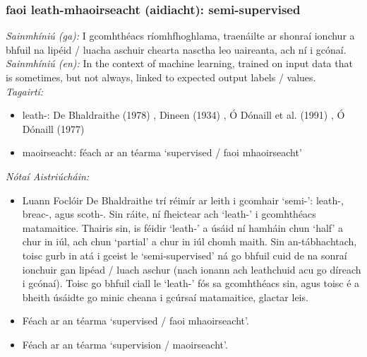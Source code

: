 \documentclass{article}
\begin{document}
\subsubsection*{faoi leath-mhaoirseacht (aidiacht): semi-supervised}
 \noindent \textit{Sainmhíniú (ga):} I gcomhthéacs ríomhfhoghlama, traenáilte ar shonraí ionchur a bhfuil na lipéid / luacha aschuir chearta nasctha leo uaireanta, ach ní i gcónaí.
\\
 \noindent \textit{Sainmhíniú (en):} In the context of machine learning, trained on input data that is sometimes, but not always, linked to expected output labels / values.
\\
 \noindent \textit{Tagairtí:}
\begin{itemize}
	\item leath-: De Bhaldraithe (1978) \cite{de-bhaldraithe}, Dineen (1934) \cite{dineen}, Ó Dónaill et al. (1991) \cite{focloir-beag}, Ó Dónaill (1977) \cite{odonaill}
	\item maoirseacht: féach ar an téarma `supervised / faoi mhaoirseacht'
\end{itemize}

 \noindent \textit{Nótaí Aistriúcháin:}
\begin{itemize}
	\item Luann Foclóir De Bhaldraithe trí réimír ar leith i gcomhair `semi-': leath-, breac-, agus scoth-. Sin ráite, ní fheictear ach `leath-' i gcomhthéacs matamaitice. Thairis sin, is féidir `leath-' a úsáid ní hamháin chun `half' a chur in iúl, ach chun `partial' a chur in iúl chomh maith. Sin an-tábhachtach, toisc gurb in atá i gceist le `semi-supervised' ná go bhfuil cuid de na sonraí ionchuir gan lipéad / luach aschur (nach ionann ach leathchuid acu go díreach i gcónaí). Toisc go bhfuil ciall le `leath-' fós sa gcomhthéacs sin, agus toisc é a bheith úsáidte go minic cheana i gcúrsaí matamaitice, glactar leis.
	\item Féach ar an téarma `supervised / faoi mhaoirseacht'.
	\item Féach ar an téarma `supervision / maoirseacht'.
\end{itemize}
\end{document}
